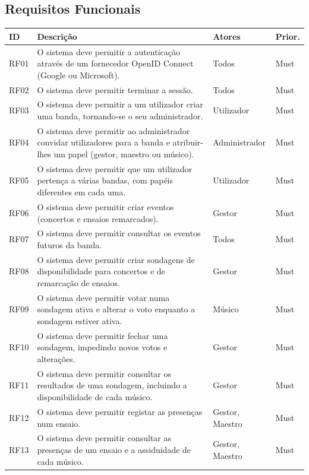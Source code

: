 \subsection{Requisitos Funcionais}
\begin{longtable}{|p{1.4cm}|p{8.6cm}|p{2.4cm}|p{1.6cm}|}
\hline
\textbf{ID} & \textbf{Descrição} & \textbf{Atores} & \textbf{Prior.} \\ \hline
\endhead
RF01 & O sistema deve permitir a autenticação através de um fornecedor OpenID Connect (Google ou Microsoft). & Todos & Must \\ \hline
RF02 & O sistema deve permitir terminar a sessão. & Todos & Must \\ \hline
RF03 & O sistema deve permitir a um utilizador criar uma banda, tornando-se o seu administrador. & Utilizador & Must \\ \hline
RF04 & O sistema deve permitir ao administrador convidar utilizadores para a banda e atribuir-lhes um papel (gestor, maestro ou músico). & Administrador & Must \\ \hline
RF05 & O sistema deve permitir que um utilizador pertença a várias bandas, com papéis diferentes em cada uma. & Utilizador & Must \\ \hline
RF06 & O sistema deve permitir criar eventos (concertos e ensaios remarcados). & Gestor & Must \\ \hline
RF07 & O sistema deve permitir consultar os eventos futuros da banda. & Todos & Must \\ \hline
RF08 & O sistema deve permitir criar sondagens de disponibilidade para concertos e de remarcação de ensaios. & Gestor & Must \\ \hline
RF09 & O sistema deve permitir votar numa sondagem ativa e alterar o voto enquanto a sondagem estiver ativa. & Músico & Must \\ \hline
RF10 & O sistema deve permitir fechar uma sondagem, impedindo novos votos e alterações. & Gestor & Must \\ \hline
RF11 & O sistema deve permitir consultar os resultados de uma sondagem, incluindo a disponibilidade de cada músico. & Gestor & Must \\ \hline
RF12 & O sistema deve permitir registar as presenças num ensaio. & Gestor, Maestro & Must \\ \hline
RF13 & O sistema deve permitir consultar as presenças de um ensaio e a assiduidade de cada músico. & Gestor, Maestro & Must \\ \hline

\end{longtable}

